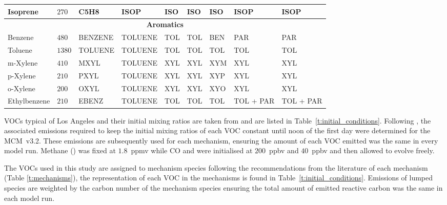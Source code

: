 \begin{sidewaystable}
\begin{tabular}{lllllllll}
        Isoprene & $270$ & C5H8 & ISOP & ISO & ISO & ISO & ISOP & ISOP \\ \hline
        \multicolumn{9}{c}{\textbf{Aromatics}} \\ \hline 
        Benzene & $480$ & BENZENE & TOLUENE & TOL & TOL & BEN & PAR & PAR \\
        Toluene & $1380$ & TOLUENE & TOLUENE & TOL & TOL & TOL & TOL & TOL \\
        m-Xylene & $410$ & MXYL & TOLUENE & XYL & XYL & XYM & XYL & XYL \\
        p-Xylene & $210$ & PXYL & TOLUENE & XYL & XYL & XYP & XYL & XYL \\
        o-Xylene & $200$ & OXYL & TOLUENE & XYL & XYL & XYO & XYL & XYL \\
        Ethylbenzene & $210$ & EBENZ & TOLUENE & TOL & TOL & TOL & TOL + PAR & TOL + PAR \\ \hline \hline
    \end{tabular}
    \vspace{1mm}
    \caption{VOC present in Los Angeles, mixing ratios are taken from \citet{Baker:2008} and their representation in each chemical mechanism. The representation of the VOC in each mechanism is based upon the recommendations of the literature for each mechanism (Table \ref{t:mechanisms}).}
    \label{t:initial_conditions}
\end{sidewaystable}

VOCs typical of Los Angeles and their initial mixing ratios are taken from \citet{Baker:2008} and are listed in \mbox{Table \ref{t:initial_conditions}}. 
Following \citet{Butler:2011}, the associated emissions required to keep the initial mixing ratios of each VOC constant until noon of the first day were determined for the \mbox{MCM v3.2.}
These emissions are subsequently used for each mechanism, ensuring the amount of each VOC emitted was the same in every model run.
Methane () was fixed at \mbox{$1.8$ ppmv} while CO and  were initialised at \mbox{$200$ ppbv} and \mbox{$40$ ppbv} and then allowed to evolve freely.

The VOCs used in this study are assigned to mechanism species following the recommendations from the literature of each mechanism (Table \ref{t:mechanisms}), the representation of each VOC in the mechanisms is found in \mbox{Table \ref{t:initial_conditions}}.
Emissions of lumped species are weighted by the carbon number of the mechanism species ensuring the total amount of emitted reactive carbon was the same in each model run.

